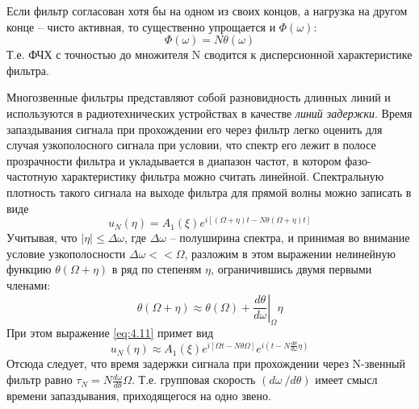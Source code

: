 Если фильтр согласован хотя бы на одном из своих концов, а нагрузка на другом конце -- чисто активная, то существенно упрощается и $\Phi(\omega)$:
\begin{equation}
\label{eq:4.10}
\Phi(\omega)=N\theta(\omega)
\end{equation}
Т.е. ФЧХ с точностью до множителя N сводится к дисперсионной характеристике фильтра.

Многозвенные фильтры представляют собой разновидность длинных линий и используются в радиотехнических устройствах в качестве \textit{линий задержки}. Время запаздывания сигнала при прохождении его через фильтр легко оценить для случая узкополосного сигнала при условии, что спектр его лежит в полосе прозрачности фильтра и укладывается в диапазон частот, в котором фазо-частотную характеристику фильтра можно считать линейной. Спектральную плотность такого сигнала на выходе фильтра для прямой волны можно записать в виде
\begin{equation}
\label{eq:4.11}
u_N(\eta)=A_1(\xi)e^{i[(\Omega+\eta)t-N\theta(\Omega+\eta)t]}
\end{equation}
Учитывая, что $|\eta|\leq\Delta\omega$, где $\Delta\omega$ -- полуширина спектра, и принимая во внимание условие узкополосности $\Delta\omega<<\Omega$, разложим в этом выражении нелинейную функцию $\theta(\Omega+\eta)$ в ряд по степеням $\eta$, ограничившись двумя первыми членами:
\begin{equation}
\label{eq:4.12}
\theta(\Omega+\eta)\approx\theta(\Omega)+\left.\frac{d\theta}{d\omega}\right|_\Omega \eta
\end{equation}
При этом выражение \eqref{eq:4.11} примет вид
\begin{equation}
\label{eq:4.13}
u_N(\eta)\approx A_1(\xi)e^{i[\Omega t-N\theta\Omega]}e^{i(t-N\frac{d\theta}{d\omega}\eta)}
\end{equation}
Отсюда следует, что время задержки сигнала при прохождении через N-звенный фильтр равно $\tau_N=N\frac{d\omega}{d\theta} \Omega$. Т.е. групповая скорость $(d\omega\ /d\theta)$ имеет смысл времени запаздывания, приходящегося на одно звено.
